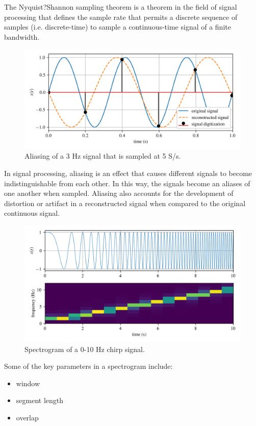 \documentclass[12pt,letter]{article}
\numberwithin{ex}{section} %
\numberwithin{re}{section} %
\begin{document}
The Nyquist?Shannon sampling theorem is a theorem in the field of signal processing that defines the sample rate that permits a discrete sequence of samples (i.e. discrete-time) to sample a continuous-time signal of a finite bandwidth. 

\begin{figure}[H]
    \centering
    \includegraphics[width=6.5in]{../Figures/aliasing.png}
    \caption{Aliasing of a 3 Hz signal that is sampled at 5 S/s.}
    \label{fig:aliasing}
\end{figure}

In signal processing, aliasing is an effect that causes different signals to become indistinguishable from each other.  In this way, the signals become an aliases of one another when sampled. Aliasing also accounts for the development of distortion or artifact in a reconstructed signal when compared to the original continuous signal.


\begin{figure}[H]
    \centering
    \includegraphics[width=6.5in]{../Figures/spectrogram.png}
    \caption{Spectrogram of a 0-10 Hz chirp signal.}
    \label{fig:spectrogram}
\end{figure}

Some of the key parameters in a spectrogram include:

\begin{itemize}
\item window
\item segment length
\item overlap
\end{itemize}
\end{document}
